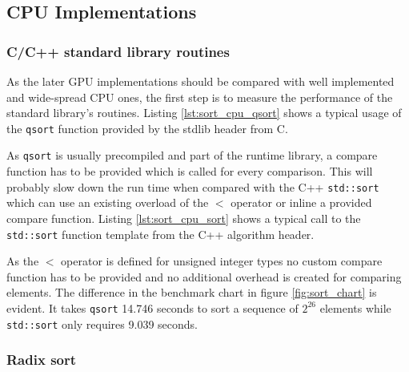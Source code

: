 \subsection{CPU Implementations}

\subsubsection{C/C++ standard library routines}

As the later GPU implementations should be compared with well implemented and wide-spread CPU ones, the first step is to measure the performance of the standard library's routines.
Listing \ref{lst:sort_cpu_qsort} shows a typical usage of the \lstinline!qsort! function provided by the stdlib header from C.



As \lstinline|qsort| is usually precompiled and part of the runtime library, a compare function has to be provided which is called for every comparison. This will probably slow down the run time when compared with the C++ \lstinline!std::sort! which can use an existing overload of the $<$ operator or inline a provided compare function.
Listing \ref{lst:sort_cpu_sort} shows a typical call to the \lstinline!std::sort! function template from the C++ algorithm header.



As the $<$ operator is defined for unsigned integer types no custom compare function has to be provided and no additional overhead is created for comparing elements.
The difference in the benchmark chart in figure \ref{fig:sort_chart} is evident. It takes \lstinline!qsort! 14.746 seconds to sort a sequence of $2^{26}$ elements while \lstinline!std::sort! only requires 9.039 seconds.

\subsubsection{Radix sort}
\label{sec:sorting_radix_cpu}

